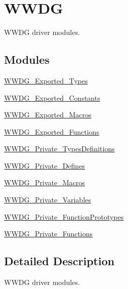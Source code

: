 \hypertarget{group___w_w_d_g}{}\section{W\+W\+DG}
\label{group___w_w_d_g}


W\+W\+DG driver modules.  


\subsection*{Modules}
\begin{DoxyCompactItemize}
\item 
\hyperlink{group___w_w_d_g___exported___types}{W\+W\+D\+G\+\_\+\+Exported\+\_\+\+Types}
\item 
\hyperlink{group___w_w_d_g___exported___constants}{W\+W\+D\+G\+\_\+\+Exported\+\_\+\+Constants}
\item 
\hyperlink{group___w_w_d_g___exported___macros}{W\+W\+D\+G\+\_\+\+Exported\+\_\+\+Macros}
\item 
\hyperlink{group___w_w_d_g___exported___functions}{W\+W\+D\+G\+\_\+\+Exported\+\_\+\+Functions}
\item 
\hyperlink{group___w_w_d_g___private___types_definitions}{W\+W\+D\+G\+\_\+\+Private\+\_\+\+Types\+Definitions}
\item 
\hyperlink{group___w_w_d_g___private___defines}{W\+W\+D\+G\+\_\+\+Private\+\_\+\+Defines}
\item 
\hyperlink{group___w_w_d_g___private___macros}{W\+W\+D\+G\+\_\+\+Private\+\_\+\+Macros}
\item 
\hyperlink{group___w_w_d_g___private___variables}{W\+W\+D\+G\+\_\+\+Private\+\_\+\+Variables}
\item 
\hyperlink{group___w_w_d_g___private___function_prototypes}{W\+W\+D\+G\+\_\+\+Private\+\_\+\+Function\+Prototypes}
\item 
\hyperlink{group___w_w_d_g___private___functions}{W\+W\+D\+G\+\_\+\+Private\+\_\+\+Functions}
\end{DoxyCompactItemize}


\subsection{Detailed Description}
W\+W\+DG driver modules. 

